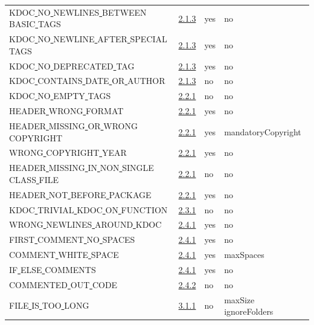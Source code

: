 \begin{longtable}{ |l|p{0.8cm}|p{0.8cm}| p{3cm} | }
KDOC\underline{ }NO\underline{ }NEWLINES\underline{ }BETWEEN\underline{ }BASIC\underline{ }TAGS & \hyperref[sec:2.1.3]{2.1.3} &  yes  &   no  \\
KDOC\underline{ }NO\underline{ }NEWLINE\underline{ }AFTER\underline{ }SPECIAL\underline{ }TAGS & \hyperref[sec:2.1.3]{2.1.3} &  yes  &   no  \\
KDOC\underline{ }NO\underline{ }DEPRECATED\underline{ }TAG & \hyperref[sec:2.1.3]{2.1.3} &  yes  &   no  \\
KDOC\underline{ }CONTAINS\underline{ }DATE\underline{ }OR\underline{ }AUTHOR & \hyperref[sec:2.1.3]{2.1.3} &  no  &   no  \\
KDOC\underline{ }NO\underline{ }EMPTY\underline{ }TAGS & \hyperref[sec:2.2.1]{2.2.1} &  no  &   no  \\
HEADER\underline{ }WRONG\underline{ }FORMAT & \hyperref[sec:2.2.1]{2.2.1} &  yes  &   no  \\
HEADER\underline{ }MISSING\underline{ }OR\underline{ }WRONG\underline{ }COPYRIGHT & \hyperref[sec:2.2.1]{2.2.1} &  yes  &  mandatoryCopyright \\
WRONG\underline{ }COPYRIGHT\underline{ }YEAR & \hyperref[sec:2.2.1]{2.2.1} &  yes  &   no  \\
HEADER\underline{ }MISSING\underline{ }IN\underline{ }NON\underline{ }SINGLE\underline{ }CLASS\underline{ }FILE & \hyperref[sec:2.2.1]{2.2.1} &  no  &   no  \\
HEADER\underline{ }NOT\underline{ }BEFORE\underline{ }PACKAGE & \hyperref[sec:2.2.1]{2.2.1} &  yes  &   no  \\
KDOC\underline{ }TRIVIAL\underline{ }KDOC\underline{ }ON\underline{ }FUNCTION & \hyperref[sec:2.3.1]{2.3.1} &  no  &   no  \\
WRONG\underline{ }NEWLINES\underline{ }AROUND\underline{ }KDOC & \hyperref[sec:2.4.1]{2.4.1} &  yes  &   no  \\
FIRST\underline{ }COMMENT\underline{ }NO\underline{ }SPACES & \hyperref[sec:2.4.1]{2.4.1} &  yes  &   no  \\
COMMENT\underline{ }WHITE\underline{ }SPACE & \hyperref[sec:2.4.1]{2.4.1} &  yes  &   maxSpaces  \\
IF\underline{ }ELSE\underline{ }COMMENTS & \hyperref[sec:2.4.1]{2.4.1} &  yes  &   no  \\
COMMENTED\underline{ }OUT\underline{ }CODE & \hyperref[sec:2.4.2]{2.4.2} &  no  &   no  \\
FILE\underline{ }IS\underline{ }TOO\underline{ }LONG & \hyperref[sec:3.1.1]{3.1.1} &  no  &   maxSize  ignoreFolders  \\

\end{longtable}
